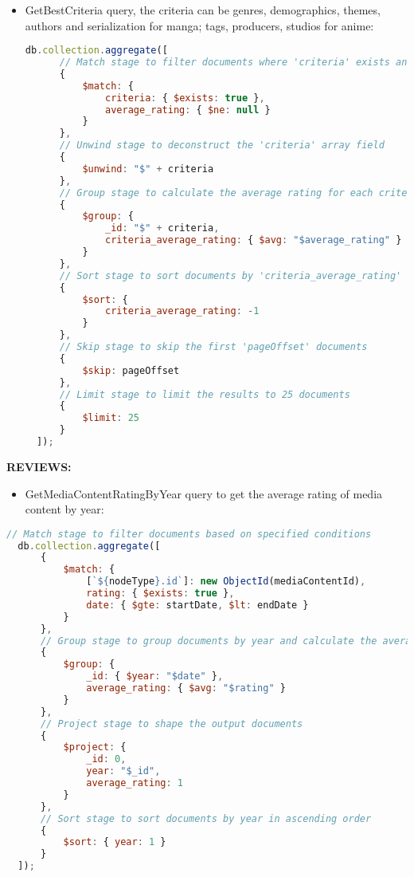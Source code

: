 \begin{itemize}

\item GetBestCriteria query, the criteria can be genres, demographics, themes, authors and serialization for manga; tags, producers, studios for anime:
\begin{lstlisting}[language=JavaScript, caption=GetBestCriteria]
  db.collection.aggregate([
      // Match stage to filter documents where 'criteria' exists and 'average_rating' is not null
      {
          $match: {
              criteria: { $exists: true },
              average_rating: { $ne: null }
          }
      },
      // Unwind stage to deconstruct the 'criteria' array field
      {
          $unwind: "$" + criteria
      },
      // Group stage to calculate the average rating for each criteria
      {
          $group: {
              _id: "$" + criteria,
              criteria_average_rating: { $avg: "$average_rating" }
          }
      },
      // Sort stage to sort documents by 'criteria_average_rating' in descending order
      {
          $sort: {
              criteria_average_rating: -1
          }
      },
      // Skip stage to skip the first 'pageOffset' documents
      {
          $skip: pageOffset
      },
      // Limit stage to limit the results to 25 documents
      {
          $limit: 25
      }
  ]);
  \end{lstlisting}

\end{itemize}

\textbf{REVIEWS:}

\begin{itemize}
\item GetMediaContentRatingByYear query to get the average rating of media content by year:
\end{itemize}


\begin{lstlisting}[language=JavaScript, caption=GetMediaContentRatingByYear]
  // Match stage to filter documents based on specified conditions
  db.collection.aggregate([
      {
          $match: {
              [`${nodeType}.id`]: new ObjectId(mediaContentId),
              rating: { $exists: true },
              date: { $gte: startDate, $lt: endDate }
          }
      },
      // Group stage to group documents by year and calculate the average rating
      {
          $group: {
              _id: { $year: "$date" },
              average_rating: { $avg: "$rating" }
          }
      },
      // Project stage to shape the output documents
      {
          $project: {
              _id: 0,
              year: "$_id",
              average_rating: 1
          }
      },
      // Sort stage to sort documents by year in ascending order
      {
          $sort: { year: 1 }
      }
  ]);
  \end{lstlisting}


